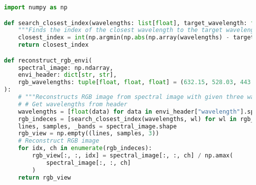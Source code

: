 \begin{lstlisting}[language=python, caption=Make RGB preview from given specral image, label={code:rgb-preview}]
import numpy as np

def search_closest_index(wavelengths: list[float], target_wavelength: float) -> int:
    """Finds the index of the closest wavelength to the target wavelength from value of envi header."""
    closest_index = int(np.argmin(np.abs(np.array(wavelengths) - target_wavelength)))
    return closest_index

def reconstruct_rgb_envi(
    spectral_image: np.ndarray,
    envi_header: dict[str, str],
    rgb_wavelengths: tuple[float, float, float] = (632.15, 528.03, 443.56),
):
    # """Reconstructs RGB image from spectral image with given three wavelengths."""
    # # Get wavelengths from header
    wavelengths = [float(data) for data in envi_header["wavelength"].split(",")]
    rgb_indeces = [search_closest_index(wavelengths, wl) for wl in rgb_wavelengths]
    lines, samples, _bands = spectral_image.shape
    rgb_view = np.empty((lines, samples, 3))
    # Reconstruct RGB image
    for idx, ch in enumerate(rgb_indeces):
        rgb_view[:, :, idx] = spectral_image[:, :, ch] / np.amax(
            spectral_image[:, :, ch]
        )
    return rgb_view

\end{lstlisting}
